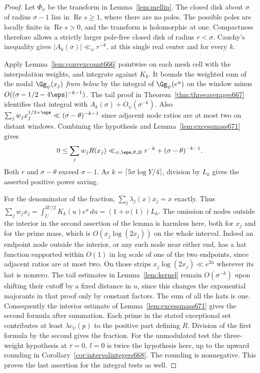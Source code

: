 \documentclass[a4paper,11pt]{article}
\theoremstyle{definition}
\theoremstyle{remark}
\newcommand{\real}{\operatorname{Re}}\newcommand{\imag}{\operatorname{Im}}
\numberwithin{equation}{section}
\begin{document}
\begin{proof}
Let \(\Phi_\psi\) be the transform in Lemma~\ref{lem:mellin}.
The closed disk about \(\sigma\) of radius \(\sigma-1\) lies in
\(\real s\ge1\), where there are no poles. The possible poles
are locally finite in \(\real s>0\), and the transform is
holomorphic at one. Compactness therefore allows a strictly
larger pole-free closed disk of radius \(r<\sigma\). Cauchy's
inequality gives \(|A_k(\sigma)|\ll_\psi r^{-k}\), at this
single real center and for every \(k\).

Apply Lemma~\ref{lem:convexcount666} pointwise on each mesh cell
with the interpolation weights, and integrate against \(K_k\).
It bounds the weighted sum of the nodal \(\Gg_\psi(x_j)\)
\emph{from below} by the integral of \(\Gg_\psi(e^u)\) on the
window minus \(O((\sigma-1/2-4\eps)^{-k-1})\).
The tail proof in Theorem~\ref{thm:threeaverages667} identifies
that integral with \(A_k(\sigma)+O_\psi(\sigma^{-k})\).
Also \(\sum_jw_j x_j^{1/2+\eps}\ll(\sigma-\theta)^{-k-1}\)
since adjacent node ratios are at most two on distant windows.
Combining the hypothesis and Lemma~\ref{lem:excessmass671}
gives
\[
 0\le\sum_j w_jR(x_j)
      \ll_{\psi,\eps,\theta,B} r^{-k}+(\sigma-\theta)^{-k-1}.
\]
Both \(r\) and \(\sigma-\theta\) exceed \(\sigma-1\). As
\(k=\lceil5\sigma\log Y/4\rceil\), division by \(L_k\)
gives the asserted positive power saving.

For the denominator of the fraction,
\(\sum_j\lambda_j(x)x_j=x\) exactly. Thus
\(\sum_jw_jx_j=\int_U^{3U/2}K_k(u)e^u\,du
=(1+o(1))L_k\). The omission of nodes outside the interior
in the second assertion of the lemma is harmless here, both
for \(x_j\) and for the prime mass, which is
\(O(x_j\log(2x_j))\) on the whole interval. Indeed an endpoint
node outside the interior, or any such node near either end,
has a hat function supported within \(O(1)\) in log scale of
one of the two endpoints, since adjacent ratios are at most two.
On those strips \(x_j\log(2x_j)\ll e^{2u}\) wherever its hat is
nonzero. The tail estimates in Lemma~\ref{lem:kernel} remain
\(O(\sigma^{-k})\) upon shifting their cutoff by a fixed
distance in \(u\), since this changes the exponential majorants
in that proof only by constant factors. The sum of all the hats is one.
Consequently the interior estimate of Lemma~\ref{lem:excessmass671}
gives the second formula after summation. Each prime in the
stated exceptional set contributes at least
\(\lambda c_\psi(p)\) to the positive part defining \(R\).
Division of the first formula by the second gives the fraction.
For the unmodulated test the three-weight hypothesis at
\(\tau=0,\ l=0\) is twice the hypothesis here, up to the upward
rounding in Corollary~\ref{cor:intervalintegers668}. The rounding
is nonnegative. This proves the last assertion for the integral
tests as well.
\end{proof}
\end{document}
